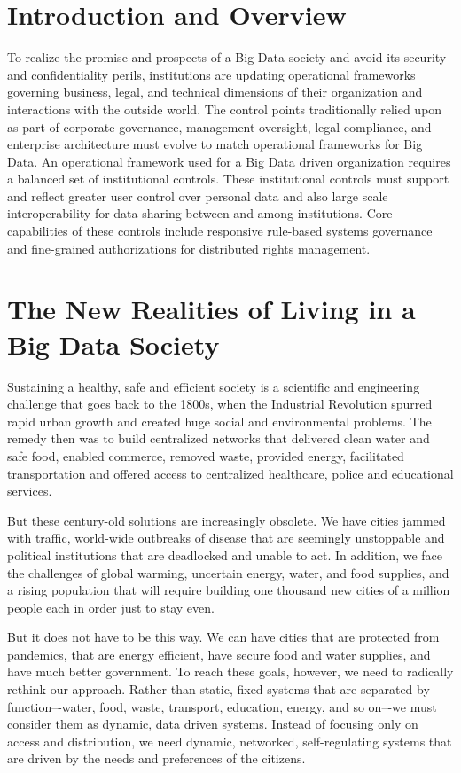 \section{Introduction and Overview}

To realize the promise and prospects of a Big Data society and avoid its security and confidentiality perils, institutions are updating operational frameworks governing business, legal, and technical dimensions of their organization and interactions with the outside world.
The control points traditionally relied upon as part of corporate governance, management oversight, legal compliance, and enterprise architecture must evolve to match operational frameworks for Big Data.
An operational framework used for a Big Data driven organization requires a balanced set of institutional controls.
These institutional controls must support and reflect greater user control over personal data and also large scale interoperability for data sharing between and among institutions.
Core capabilities of these controls include responsive rule-based systems governance and fine-grained authorizations for distributed rights management.

\section{The New Realities of Living in a Big Data Society}

Sustaining a healthy, safe and efficient society is a scientific and engineering challenge that goes back to the 1800s, when the Industrial Revolution spurred rapid urban growth and created huge social and environmental problems.
The remedy then was to build centralized networks that delivered clean water and safe food, enabled commerce, removed waste, provided energy, facilitated transportation and offered access to centralized healthcare, police and educational services.

But these century-old solutions are increasingly obsolete.
We have cities jammed with traffic, world-wide outbreaks of disease that are seemingly unstoppable and political institutions that are deadlocked and unable to act.
In addition, we face the challenges of global warming, uncertain energy, water, and food supplies, and a rising population that will require building one thousand new cities of a million people each in order just to stay even.

But it does not have to be this way.
We can have cities that are protected from pandemics, that are energy efficient, have secure food and water supplies, and have much better government.
To reach these goals, however, we need to radically rethink our approach.
Rather than static, fixed systems that are separated by function–-water, food, waste, transport, education, energy, and so on–-we must consider them as dynamic, data driven systems.
Instead of focusing only on access and distribution, we need dynamic, networked, self-regulating systems that are driven by the needs and preferences of the citizens.


